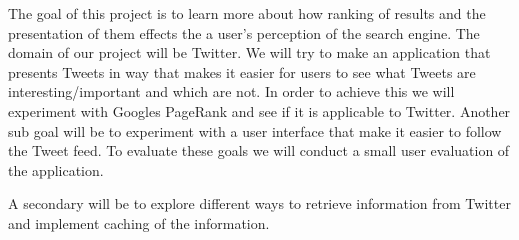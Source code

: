 The goal of this project is to learn more about how ranking of results and the presentation of them effects the a user's perception of the search engine. The domain of our project will be Twitter. We will try to make an application that presents Tweets in way that makes it easier for users to see what Tweets are interesting/important and which are not. In order to achieve this we will experiment with Googles PageRank and see if it is applicable to Twitter. Another sub goal will be to experiment with a user interface that make it easier to follow the Tweet feed. To evaluate these goals we will conduct a small user evaluation of the application.

A secondary will be to explore different ways to retrieve information from Twitter and implement caching of the information.









